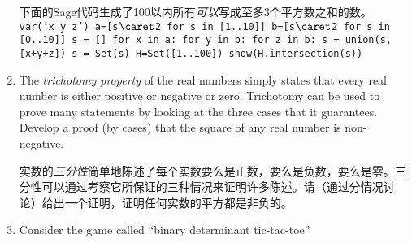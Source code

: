 \begin{enumerate}
{  下面的Sage代码生成了100以内所有{\em 可以}写成至多3个平方数之和的数。
  {\tt
  var('x y z') \newline
  a=[s$\caret$2 for s in [1..10]]  \newline
  b=[s$\caret$2 for s in [0..10]]  \newline
  s = []  \newline
  for x in a:  \newline
  \tab for y in b:  \newline
  \tab \tab for z in b:  \newline
  \tab \tab \tab s = union(s,[x+y+z])  \newline
  s = Set(s)  \newline
  H=Set([1..100]) \newline
  show(H.intersection(s))  \newline
  }
  }
  
  \wbvfill
  
  \workbookpagebreak
  
  \item The \emph{trichotomy property} of the real 
  numbers simply states that every real number is either positive or negative 
  or zero.
  Trichotomy can be used to prove many statements by looking at the
  three cases that it guarantees.
  Develop a proof (by cases) that the square of
  any real number is non-negative.
  
  实数的\emph{三分性}简单地陈述了每个实数要么是正数，要么是负数，要么是零。三分性可以通过考察它所保证的三种情况来证明许多陈述。请（通过分情况讨论）给出一个证明，证明任何实数的平方都是非负的。
  
  \wbvfill
  
  \hintspagebreak
  
  \item Consider the game called ``binary determinant tic-tac-toe''
\end{enumerate}
